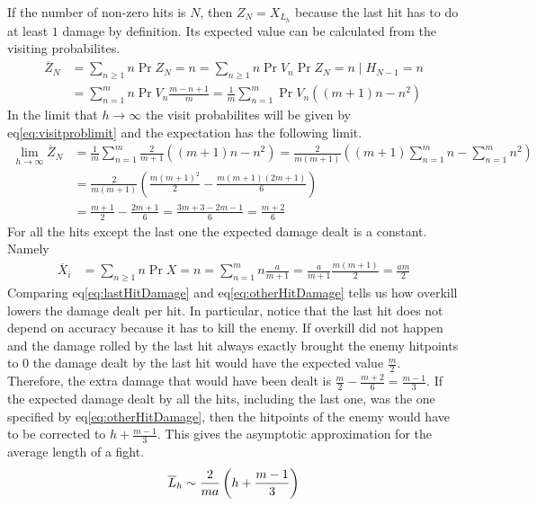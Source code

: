 If the number of non-zero hits is $N$, then $Z_N = X_{L_h}$ because the last hit has to do at least $1$ damage by definition. Its expected value can be calculated from the visiting probabilites.
\begin{align}
    \overline{Z}_N &= \sum_{n \geq 1} n \Pr{Z_N = n}
    = \sum_{n \geq 1} n \Pr{V_n} \Pr{Z_N = n \mid H_{N-1} = n}\nonumber\\
                    &= \sum_{n=1}^{m} n \Pr{V_n} \frac{m-n+1}{m}
                    = \frac{1}{m}\sum_{n=1}^{m}\Pr{V_n}\left((m+1)n - n^2\right) \nonumber
\end{align}
In the limit that $h \rightarrow \infty$ the visit probabilites will be given by eq\ref{eq:visitproblimit} and the expectation has the following limit.
\begin{align}
    \lim_{h \rightarrow \infty}\overline{Z}_N
              &= \frac{1}{m}\sum_{n=1}^{m}\frac{2}{m+1} \left((m+1)n - n^2\right)
              = \frac{2}{m(m+1)}\left((m+1)\sum_{n=1}^{m} n - \sum_{n=1}^{m} n^2\right)\nonumber\\
              &= \frac{2}{m(m+1)}\left(\frac{m{(m+1)}^2}{2} - \frac{m(m+1)(2m+1)}{6}\right)\nonumber\\
              &= \frac{m+1}{2} - \frac{2m+1}{6}
              = \frac{3m+3 - 2m-1}{6}
              = \frac{m+2}{6}\label{eq:lastHitDamage}
\end{align}
For all the hits except the last one the expected damage dealt is a constant. Namely
\begin{align}
    \overline{X}_i
        &= \sum_{n \geq 1} n \Pr{X = n}
        = \sum_{n = 1}^{m} n \frac{a}{m+1}
        = \frac{a}{m+1}\frac{m(m+1)}{2}
        = \frac{am}{2}\label{eq:otherHitDamage}
\end{align}
Comparing eq\ref{eq:lastHitDamage} and eq\ref{eq:otherHitDamage} tells us how overkill lowers the damage dealt per hit. In particular, notice that the last hit does not depend on accuracy because it has to kill the enemy. If overkill did not happen and the damage rolled by the last hit always exactly brought the enemy hitpoints to $0$ the damage dealt by the last hit would have the expected value $\frac{m}{2}$. Therefore, the extra damage that would have been dealt is $\frac{m}{2}-\frac{m+2}{6}=\frac{m-1}{3}$.
If the expected damage dealt by all the hits, including the last one, was the one specified by eq\ref{eq:otherHitDamage}, then the hitpoints of the enemy would have to be corrected to $h+\frac{m-1}{3}$. This gives the asymptotic approximation for the average length of a fight.
\begin{align}\label{eq:asymptoticAppr}
\overline{L}_h \sim \frac{2}{ma}\left(h + \frac{m-1}{3}\right)
\end{align}

